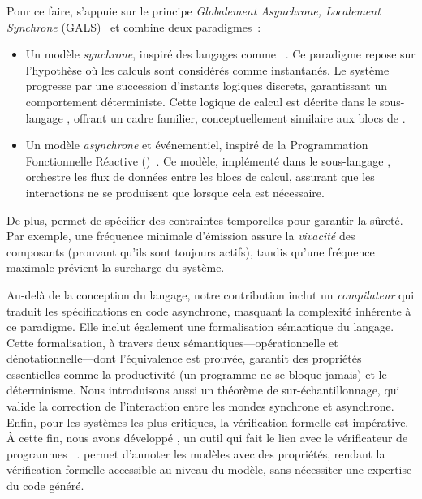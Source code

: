 Pour ce faire, \GRust s'appuie sur le principe \emph{Globalement Asynchrone, Localement Synchrone}
(GALS)~\cite{DBLP:phd/us/Chapiro85} et combine deux paradigmes~:
\begin{itemize}
      \item Un modèle \emph{synchrone}, inspiré des langages comme \Lustre~\cite{%
                  DBLP:conf/ifip/Kahn74,%
                  DBLP:conf/popl/CaspiPHP87,%
                  DBLP:conf/tase/ColacoPP17%
            }. Ce paradigme repose sur l'hypothèse où les calculs sont considérés comme instantanés.
            Le système progresse par une succession d'instants logiques discrets, garantissant un
            comportement déterministe. Cette logique de calcul est décrite dans \GRust \via le
            sous-langage \GRSync, offrant un cadre familier, conceptuellement similaire aux blocs de
            \Simulink.

      \item Un modèle \emph{asynchrone} et événementiel, inspiré de la Programmation Fonctionnelle
            Réactive (\frp)~\cite{%
                  DBLP:conf/icfp/ElliottH97,%
                  DBLP:conf/haskell/Elliott09,%
                  DBLP:conf/padl/WanTH02%
            }. Ce modèle, implémenté dans le sous-langage \GRFRP, orchestre les flux de données
            entre les blocs de calcul, assurant que les interactions ne se produisent que lorsque
            cela est nécessaire.
\end{itemize}

De plus, \GRust permet de spécifier des contraintes temporelles pour garantir la sûreté. Par
exemple, une fréquence minimale d'émission assure la \emph{vivacité} des composants (prouvant qu'ils
sont toujours actifs), tandis qu'une fréquence maximale prévient la surcharge du système.

Au-delà de la conception du langage, notre contribution inclut un \emph{compilateur} qui traduit les
spécifications \GRust en code \Rust asynchrone, masquant la complexité inhérente à ce paradigme.
Elle inclut également une formalisation sémantique du langage. Cette formalisation, à travers deux
sémantiques---opérationnelle et dénotationnelle---dont l'équivalence est prouvée, garantit des
propriétés essentielles comme la productivité (un programme ne se bloque jamais) et le déterminisme.
Nous introduisons aussi un théorème de sur-échantillonnage, qui valide la correction de
l'interaction entre les mondes synchrone et asynchrone.
%
Enfin, pour les systèmes les plus critiques, la vérification formelle est impérative. À cette fin,
nous avons développé \GReusot, un outil qui fait le lien avec le vérificateur de programmes \Rust
\Creusot~\cite{DBLP:conf/icfem/DenisJM22}. \GReusot permet d'annoter les modèles \GRust avec des
propriétés, rendant la vérification formelle accessible au niveau du modèle, sans nécessiter une
expertise du code généré.

